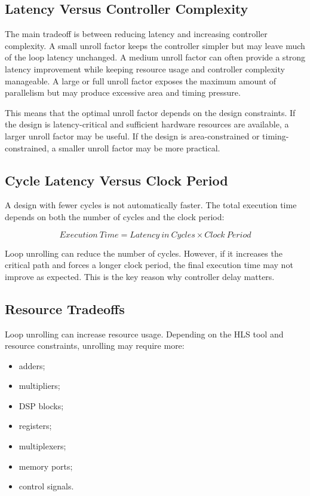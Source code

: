 \documentclass[conference]{IEEEtran}
\begin{document}
\subsection{Latency Versus Controller Complexity}

The main tradeoff is between reducing latency and increasing controller complexity. A small unroll factor keeps the controller simpler but may leave much of the loop latency unchanged. A medium unroll factor can often provide a strong latency improvement while keeping resource usage and controller complexity manageable. A large or full unroll factor exposes the maximum amount of parallelism but may produce excessive area and timing pressure.

This means that the optimal unroll factor depends on the design constraints. If the design is latency-critical and sufficient hardware resources are available, a larger unroll factor may be useful. If the design is area-constrained or timing-constrained, a smaller unroll factor may be more practical.

\subsection{Cycle Latency Versus Clock Period}

A design with fewer cycles is not automatically faster. The total execution time depends on both the number of cycles and the clock period:

\begin{equation}
Execution\ Time = Latency\ in\ Cycles \times Clock\ Period
\end{equation}

Loop unrolling can reduce the number of cycles. However, if it increases the critical path and forces a longer clock period, the final execution time may not improve as expected. This is the key reason why controller delay matters.

\subsection{Resource Tradeoffs}

Loop unrolling can increase resource usage. Depending on the HLS tool and resource constraints, unrolling may require more:

\begin{itemize}
    \item adders;
    \item multipliers;
    \item DSP blocks;
    \item registers;
    \item multiplexers;
    \item memory ports;
    \item control signals.
\end{itemize}
\end{document}
